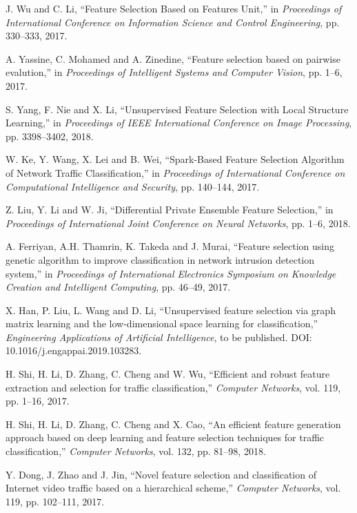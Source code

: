 \documentclass{ieeeaccess}
\theoremstyle{definition}
\begin{document}
\begin{thebibliography}{00}
    J. Wu and C. Li, ``Feature Selection Based on Features Unit,'' in \emph{Proceedings of International Conference on Information Science and Control Engineering}, pp. 330--333, 2017.

    A. Yassine, C. Mohamed and A. Zinedine, ``Feature selection based on pairwise evalution,'' in \emph{Proceedings of Intelligent Systems and Computer Vision}, pp. 1--6, 2017.

    S. Yang, F. Nie and X. Li, ``Unsupervised Feature Selection with Local Structure Learning,'' in \emph{Proceedings of IEEE International Conference on Image Processing}, pp. 3398--3402, 2018.

    W. Ke, Y. Wang, X. Lei and B. Wei, ``Spark-Based Feature Selection Algorithm of Network Traffic Classification,'' in \emph{Proceedings of International Conference on Computational Intelligence and Security}, pp. 140--144, 2017.
    
    Z. Liu, Y. Li and W. Ji, ``Differential Private Ensemble Feature Selection,'' in \emph{Proceedings of International Joint Conference on Neural Networks}, pp. 1--6, 2018.

    A. Ferriyan, A.H. Thamrin, K. Takeda and J. Murai, ``Feature selection using genetic algorithm to improve classification in network intrusion detection system,'' in \emph{Proceedings of International Electronics Symposium on Knowledge Creation and Intelligent Computing}, pp. 46--49, 2017.

    X. Han, P. Liu, L. Wang and D. Li, ``Unsupervised feature selection via graph matrix learning and the low-dimensional space learning for classification,'' \emph{Engineering Applications of Artificial Intelligence}, to be published. DOI: 10.1016/j.engappai.2019.103283.

    H. Shi, H. Li, D. Zhang, C. Cheng and W. Wu, ``Efficient and robust feature extraction and selection for traffic classification,'' \emph{Computer Networks}, vol. 119, pp. 1--16, 2017.

    H. Shi, H. Li, D. Zhang, C. Cheng and X. Cao, ``An efficient feature generation approach based on deep learning and feature selection techniques for traffic classification,'' \emph{Computer Networks}, vol. 132, pp. 81--98, 2018.

    Y. Dong, J. Zhao and J. Jin, ``Novel feature selection and  classification of Internet video traffic based on a hierarchical scheme,'' \emph{Computer Networks}, vol. 119, pp. 102--111, 2017.


\end{thebibliography}
\end{document}
